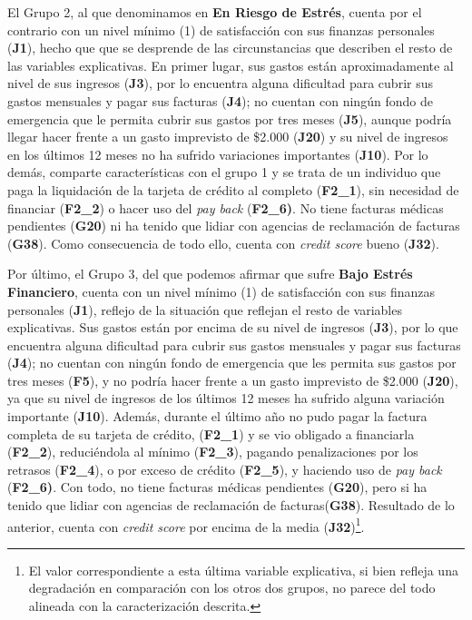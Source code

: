\documentclass[a4paper, 11pt]{article}
\begin{document}
El Grupo 2, al que denominamos en \textbf{En Riesgo de Estrés}, cuenta por el contrario con
un nivel mínimo (1) de satisfacción con sus finanzas personales (\textbf{J1}), hecho que 
que se desprende de las circunstancias que describen el resto de las variables explicativas.
En primer lugar, sus gastos están aproximadamente al nivel de sus ingresos (\textbf{J3}),
por lo encuentra alguna dificultad para cubrir sus gastos mensuales y pagar sus facturas
(\textbf{J4}); no cuentan con ningún fondo de emergencia que le permita cubrir 
sus gastos por tres meses (\textbf{J5}), aunque podría llegar hacer frente a un gasto 
imprevisto de \$2.000 (\textbf{J20}) y su nivel de ingresos en los últimos 12 meses no 
ha sufrido variaciones importantes (\textbf{J10}). Por lo demás, comparte características
con el grupo 1 y se trata de un individuo que paga la liquidación de la tarjeta de crédito
al completo (\textbf{F2\_1}), sin necesidad de financiar (\textbf{F2\_2}) o hacer uso del
\textit{pay back} (\textbf{F2\_6)}. No tiene facturas médicas pendientes (\textbf{G20}) 
ni ha tenido que lidiar con agencias de reclamación de facturas (\textbf{G38}).
Como consecuencia de todo ello, cuenta con \textit{credit score} bueno (\textbf{J32}). 

Por último, el Grupo 3, del que podemos afirmar que sufre \textbf{Bajo Estrés Financiero}, 
cuenta con un nivel mínimo (1) de satisfacción con sus finanzas personales (\textbf{J1}),
reflejo de la situación que reflejan el resto de variables explicativas. Sus gastos están
por encima de su nivel de ingresos (\textbf{J3}), por lo que encuentra alguna dificultad para
cubrir sus gastos mensuales y pagar sus facturas (\textbf{J4}); no cuentan con ningún
fondo de emergencia que les permita sus gastos por tres meses (\textbf{F5}), y no podría 
hacer frente a un gasto imprevisto de \$2.000 (\textbf{J20}), ya que su nivel de ingresos 
de los últimos 12 meses ha sufrido alguna variación importante (\textbf{J10}). 
Además, durante el último año no pudo pagar la factura completa de su tarjeta de crédito,
(\textbf{F2\_1}) y se vio obligado a financiarla (\textbf{F2\_2}), reduciéndola al mínimo
(\textbf{F2\_3}), pagando penalizaciones por los retrasos (\textbf{F2\_4}), o por exceso de
crédito (\textbf{F2\_5}), y haciendo uso de \textit{pay back} (\textbf{F2\_6)}.
Con todo, no tiene facturas médicas pendientes (\textbf{G20}), pero si ha tenido que lidiar
con agencias de reclamación de facturas(\textbf{G38}). Resultado de lo anterior, cuenta con \textit{credit score} por encima de la media (\textbf{J32})\footnote{El valor 
correspondiente a esta última variable explicativa, si bien refleja una degradación en
comparación con los otros dos grupos, no parece del todo alineada con la caracterización
descrita.}. 
\end{document}
